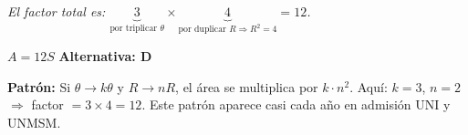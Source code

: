 \begin{tcolorbox}[
  enhanced, breakable,
  colback=GrisClaro, colframe=AzulPizarra,
  fonttitle=\bfseries\sffamily\color{white},
  title={Trigonometría — Ejercicio 4},
  arc=3pt, boxrule=0.8pt
]
\noindent\textit{El factor total es: $\underbrace{3}_{\text{por triplicar }\theta}
\times \underbrace{4}_{\text{por duplicar }R \Rightarrow R^2 = 4} = 12$.}

\begin{tcolorbox}[
  colback=AzulClaro!60, colframe=AzulPizarra,
  arc=2pt, boxrule=0.8pt, left=8pt, right=8pt
]
\centering
$\displaystyle A = 12S$
\quad\textbf{Alternativa: D}
\end{tcolorbox}

\begin{cajatip}
\textbf{Patrón:} Si $\theta \to k\theta$ y $R \to nR$, el área se multiplica por $k \cdot n^2$.
Aquí: $k=3$, $n=2$ $\Rightarrow$ factor $= 3 \times 4 = 12$.
Este patrón aparece casi cada año en admisión UNI y UNMSM.
\end{cajatip}

\end{tcolorbox}

\vspace{0.4cm}

